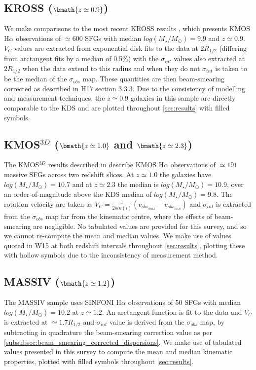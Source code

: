 \documentclass[fleqn,usenatbib]{mnras}
\begin{document}
\subsection{KROSS ($\bmath{z\simeq0.9}$)}\label{subsec:KROSS}
We make comparisons to the most recent KROSS results \citep[H17]{Harrison2017}, which presents KMOS H$\alpha$ observations of $\simeq600$ SFGs with median $log(M_{\star}/M_{\odot})=9.9$ and $z\simeq0.9$.
$V_{C}$ values are extracted from exponential disk fits to the data at $2R_{1/2}$ (differing from arctangent fits by a median of 0.5\%) with the $\sigma_{int}$ values also extracted at $2R_{1/2}$ when the data extend to this radius and when they do not $\sigma_{int}$ is taken to be the median of the $\sigma_{obs}$ map.
These quantities are then beam-smearing corrected as described in H17 section 3.3.3. 
Due to the consistency of modelling and measurement techniques, the $z\simeq0.9$ galaxies in this sample are directly comparable to the KDS and are plotted throughout \cref{sec:results} with filled symbols.

\subsection{KMOS$^{3D}$ ($\bmath{z\simeq1.0}$ and $\bmath{z\simeq2.3}$)}\label{subsec:kmos_3d}
The KMOS$^{3D}$ results described in \cite[W15]{Wisnioski2015} describe KMOS H$\alpha$ observations of $\simeq191$ massive SFGs across two redshift slices. 
At $z\simeq1.0$ the galaxies have $log(M_{\star}/M_{\odot})=10.7$ and at $z\simeq2.3$ the median is $log(M_{\star}/M_{\odot})=10.9$, over an order-of-magnitude above the KDS median of $log(M_{\star}/M_{\odot})=9.8$. The rotation velocity are taken as $V_{C} = \frac{1}{2sin(i)}(v_{obs_{max}} - v_{obs_{min}})$ and $\sigma_{int}$ is extracted from the $\sigma_{obs}$ map far from the kinematic centre, where the effects of beam-smearing are negligible.
No tabulated values are provided for this survey, and so we cannot re-compute the mean and median values.
We make use of values quoted in W15 at both redshift intervals throughout \cref{sec:results}, plotting these with hollow symbols due to the inconsistency of measurement method.

\subsection{MASSIV ($\bmath{z\simeq1.2}$)}\label{subsec:MASSIV}
The MASSIV sample \citep[E12]{Epinat2012} uses SINFONI H$\alpha$ observations of 50 SFGs with median $log(M_{\star}/M_{\odot})=10.2$ at $z\simeq1.2$.
An arctangent function is fit to the data and $V_{C}$ is extracted at $\simeq1.7R_{1/2}$ and $\sigma_{int}$ value is derived from the $\sigma_{obs}$ map, by subtracting in quadrature the beam-smearing correction value as per \cref{subsubsec:beam_smearing_corrected_dispersions}.
We make use of tabulated values presented in this survey to compute the mean and median kinematic properties, plotted with filled symbols throughout \cref{sec:results}.
\end{document}
